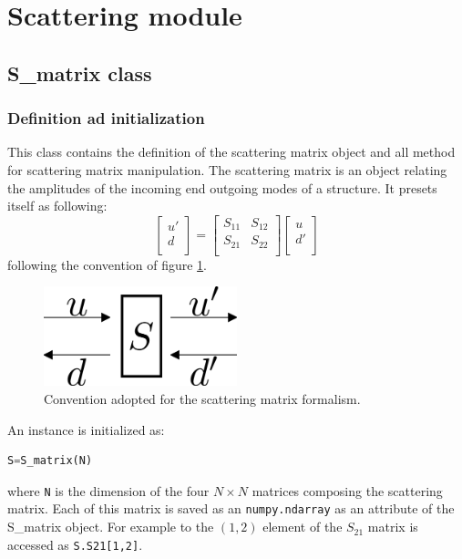 \documentclass[a4paper,10pt]{report}
\begin{document}
\section{Scattering module}
\subsection{S\_matrix class}
\subsubsection{Definition ad initialization}
This class contains the definition of the scattering matrix object and all method for scattering matrix manipulation. The scattering matrix is an object relating the amplitudes of the incoming end outgoing modes of a structure. It presets itself as following:
\begin{equation} \label{eq:S_matrix_def}
\left[
\begin{array}{c}
u' \\
d  \\
\end{array} 
 \right] = \left[
 \begin{array}{cc}
S_{11} & S_{12} \\
S_{21} & S_{22} \\
\end{array}
 \right]
 \left[
\begin{array}{c}
u \\
d' \\
\end{array} 
\right]
\end{equation}
following the convention of figure \ref{fig:SM_conv}.
\begin{figure}
\centering
\includegraphics[width=0.5\textwidth]{figures/S.png}
\caption{Convention adopted for the scattering matrix formalism.} \label{fig:SM_conv}
\end{figure}
An instance is initialized as:
\begin{lstlisting}[language=Python]
S=S_matrix(N)
\end{lstlisting}
where \texttt{N} is the dimension of the four $N \times N$ matrices composing the scattering matrix. Each of this matrix is saved as an \texttt{numpy.ndarray} as an attribute of the S\_matrix object. For example to the $(1,2)$ element of the $S_{21}$ matrix is accessed as \texttt{S.S21[1,2]}.
\end{document}
